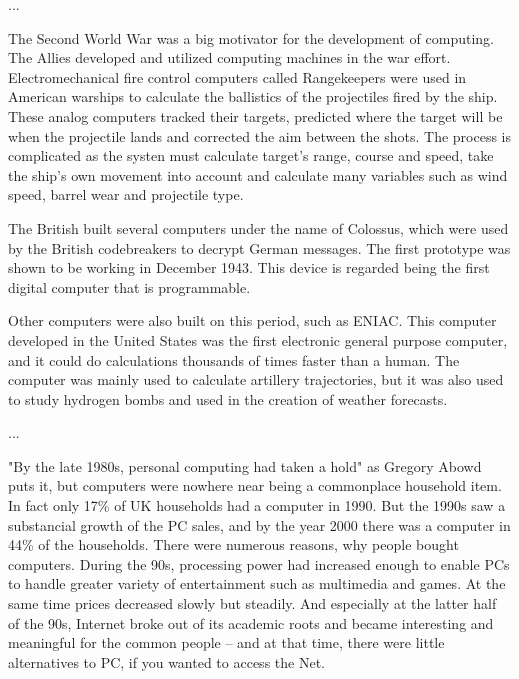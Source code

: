 \documentclass[a4paper,12pt]{article}
\begin{document}
...

The Second World War was a big motivator for the development of computing. The Allies developed and utilized computing machines in the war effort. Electromechanical fire control computers called Rangekeepers were used in American warships to calculate the ballistics of the projectiles fired by the ship. These analog computers tracked their targets, predicted where the target will be when the projectile lands and corrected the aim between the shots. The process is complicated as the systen must calculate target's range, course and speed, take the ship's own movement into account and calculate many variables such as wind speed, barrel wear and projectile type.

The British built several computers under the name of Colossus, which were used by the British codebreakers to decrypt German messages. The first prototype was shown to be working in December 1943. This device is regarded being the first digital computer that is programmable.

Other computers were also built on this period, such as ENIAC. This computer developed in the United States was the first electronic general purpose computer, and it could do calculations thousands of times faster than a human. The computer was mainly used to calculate artillery trajectories, but it was also used to study hydrogen bombs and used in the creation of weather forecasts.

...

"By the late 1980s, personal computing had taken a hold" as Gregory Abowd puts it\cite{gda}, but computers were nowhere near being a commonplace household item. In fact only 17\% of UK households had a computer in 1990\cite{stat}. But the 1990s saw a substancial growth of the PC sales, and by the year 2000 there was a computer in 44\% of the households\cite{stat}. There were numerous reasons, why people bought computers. During the 90s, processing power had increased enough to enable PCs to handle greater variety of entertainment such as multimedia and games. At the same time prices decreased slowly but steadily. And especially at the latter half of the 90s, Internet broke out of its academic roots and became interesting and meaningful for the common people -- and at that time, there were little alternatives to PC, if you wanted to access the Net.


\newpage
\end{document}
